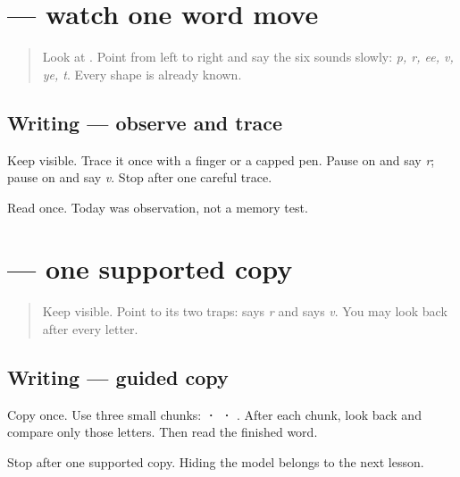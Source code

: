 \section[Practice]{ — watch one word move}

\label{lesson:RU-W05-privet-observe}



\begin{quote}
Look at \textbf{}. Point from left to right and say the six sounds slowly: \emph{p, r, ee, v, ye, t}. Every shape is already known.
\end{quote}

\subsection*{Writing — observe and trace}
Keep \textbf{} visible. Trace it once with a finger or a capped pen. Pause on \textbf{} and say \emph{r}; pause on \textbf{} and say \emph{v}. Stop after one careful trace.

\begin{tcolorbox}[breakable,colback=teal!4,colframe=teal!35!black,title={Before you move on}]
Read \textbf{} once. Today was observation, not a memory test.
\end{tcolorbox}
\section[\texorpdfstring{\ru{привет} (privét)}{привет (privét)}]{ — one supported copy}

\label{lesson:RU-W05-privet-guided-copy}



\begin{quote}
Keep \textbf{} visible. Point to its two traps: \textbf{} says \emph{r} and \textbf{} says \emph{v}. You may look back after every letter.
\end{quote}

\subsection*{Writing — guided copy}
Copy \textbf{} once. Use three small chunks: \textbf{ ·  · }. After each chunk, look back and compare only those letters. Then read the finished word.

\begin{tcolorbox}[breakable,colback=teal!4,colframe=teal!35!black,title={Before you move on}]
Stop after one supported copy. Hiding the model belongs to the next lesson.
\end{tcolorbox}
